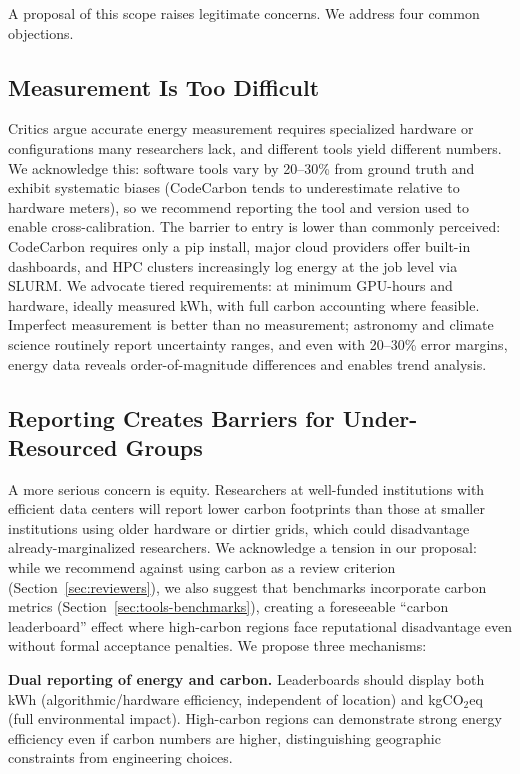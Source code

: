 \documentclass{article}
\theoremstyle{plain}
\theoremstyle{definition}
\theoremstyle{remark}
\begin{document}
A proposal of this scope raises legitimate concerns. We address four common objections.

\subsection{Measurement Is Too Difficult}

Critics argue accurate energy measurement requires specialized hardware or configurations many researchers lack, and different tools yield different numbers. We acknowledge this: software tools vary by 20--30\% from ground truth \cite{jay2023experimental} and exhibit systematic biases (CodeCarbon tends to underestimate relative to hardware meters), so we recommend reporting the tool and version used to enable cross-calibration. The barrier to entry is lower than commonly perceived: CodeCarbon requires only a pip install, major cloud providers offer built-in dashboards, and HPC clusters increasingly log energy at the job level via SLURM. We advocate tiered requirements: at minimum GPU-hours and hardware, ideally measured kWh, with full carbon accounting where feasible. Imperfect measurement is better than no measurement; astronomy and climate science routinely report uncertainty ranges, and even with 20--30\% error margins, energy data reveals order-of-magnitude differences and enables trend analysis.

\subsection{Reporting Creates Barriers for Under-Resourced Groups}

A more serious concern is equity. Researchers at well-funded institutions with efficient data centers will report lower carbon footprints than those at smaller institutions using older hardware or dirtier grids, which could disadvantage already-marginalized researchers. We acknowledge a tension in our proposal: while we recommend against using carbon as a review criterion (Section~\ref{sec:reviewers}), we also suggest that benchmarks incorporate carbon metrics (Section~\ref{sec:tools-benchmarks}), creating a foreseeable ``carbon leaderboard'' effect where high-carbon regions face reputational disadvantage even without formal acceptance penalties. We propose three mechanisms:

\textbf{Dual reporting of energy and carbon.} Leaderboards should display both kWh (algorithmic/hardware efficiency, independent of location) and kgCO$_2$eq (full environmental impact). High-carbon regions can demonstrate strong energy efficiency even if carbon numbers are higher, distinguishing geographic constraints from engineering choices.
\end{document}
